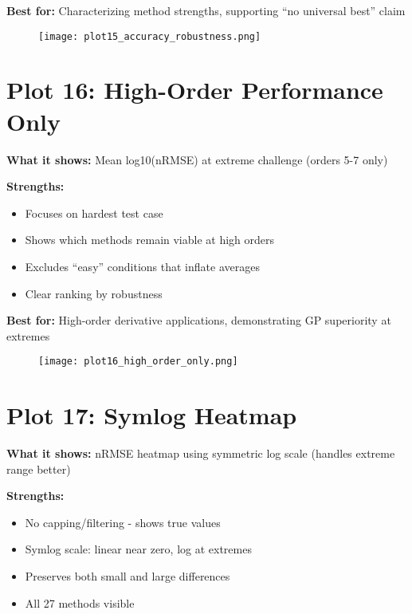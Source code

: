 \documentclass[11pt]{article}
\begin{document}
\textbf{Best for:} Characterizing method strengths, supporting ``no universal best'' claim

\begin{figure}[h]
\centering
\texttt{[image: plot15\_accuracy\_robustness.png]}
\end{figure}

\clearpage


\section*{Plot 16: High-Order Performance Only}

\textbf{What it shows:} Mean log10(nRMSE) at extreme challenge (orders 5-7 only)

\textbf{Strengths:}
\begin{itemize}
    \item Focuses on hardest test case
    \item Shows which methods remain viable at high orders
    \item Excludes ``easy'' conditions that inflate averages
    \item Clear ranking by robustness
\end{itemize}

\textbf{Best for:} High-order derivative applications, demonstrating GP superiority at extremes

\begin{figure}[h]
\centering
\texttt{[image: plot16\_high\_order\_only.png]}
\end{figure}

\clearpage


\section*{Plot 17: Symlog Heatmap}

\textbf{What it shows:} nRMSE heatmap using symmetric log scale (handles extreme range better)

\textbf{Strengths:}
\begin{itemize}
    \item No capping/filtering - shows true values
    \item Symlog scale: linear near zero, log at extremes
    \item Preserves both small and large differences
    \item All 27 methods visible
\end{itemize}
\end{document}
